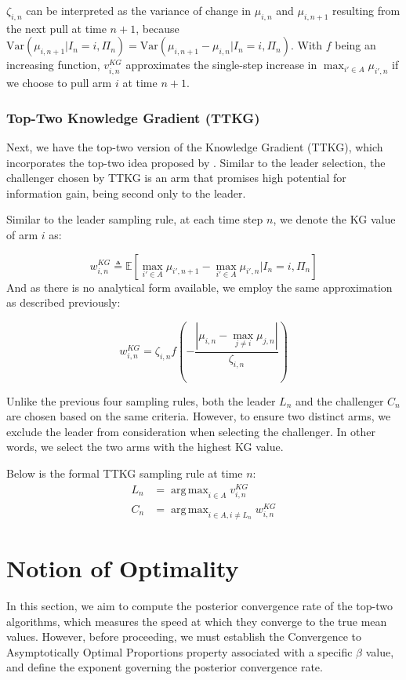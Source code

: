 \documentclass[a4paper, 12pt]{article}
\DeclareMathOperator{\argmax}{arg\,max}
\theoremstyle{definition}
\begin{document}
$\zeta_{i,n}$ can be interpreted as the variance of change in $\mu_{i,n}$ and $\mu_{i,n+1}$ resulting from the next pull at time $n+1$, because $\mathrm{Var}(\mu_{i,n+1}|I_n = i, \Pi_n) = \mathrm{Var}(\mu_{i,n+1}- \mu_{i,n}|I_n = i, \Pi_n)$. With $f$ being an increasing function, $v_{i,n}^{KG}$ approximates the single-step increase in $\max_{i'\in A} \mu_{i',n}$ if we choose to pull arm $i$ at time $n+1$.

\subsubsection{Top-Two Knowledge Gradient (TTKG)}
Next, we have the top-two version of the Knowledge Gradient (TTKG), which incorporates the top-two idea proposed by \cite{toptwo}. Similar to the leader selection, the challenger chosen by TTKG is an arm that promises high potential for information gain, being second only to the leader.

Similar to the leader sampling rule, at each time step $n$, we denote the KG value of arm $i$ as:

\[
w_{i,n}^{KG} \triangleq \mathbb{E} \left[\max_{i' \in A} \mu_{i',n+1} - \max_{i' \in A} \mu_{i',n} \bigg| I_n = i, \Pi_n \right]
\]
And as there is no analytical form available, we employ the same approximation as described previously:

\[
w_{i,n}^{KG} = \zeta_{i,n} f\left(-\frac{|\mu_{i,n}-\max_{j\neq i} \mu_{j,n}|}{\zeta_{i,n}}\right)
\]

Unlike the previous four sampling rules, both the leader $L_n$ and the challenger $C_n$ are chosen based on the same criteria. However, to ensure two distinct arms, we exclude the leader from consideration when selecting the challenger. In other words, we select the two arms with the highest KG value.

Below is the formal TTKG sampling rule at time $n$:
\begin{align} \label{eq:ttkg}
L_n & = \argmax_{i\in A} v_{i,n}^{KG} \nonumber \\
C_n & = \argmax_{i\in A,i\neq L_n} w_{i,n}^{KG}
\end{align}



\section{Notion of Optimality} \label{sec:optimality}
In this section, we aim to compute the posterior convergence rate of the top-two algorithms, which measures the speed at which they converge to the true mean values. However, before proceeding, we must establish the Convergence to Asymptotically Optimal Proportions property associated with a specific $\beta$ value, and define the exponent governing the posterior convergence rate.
\end{document}
